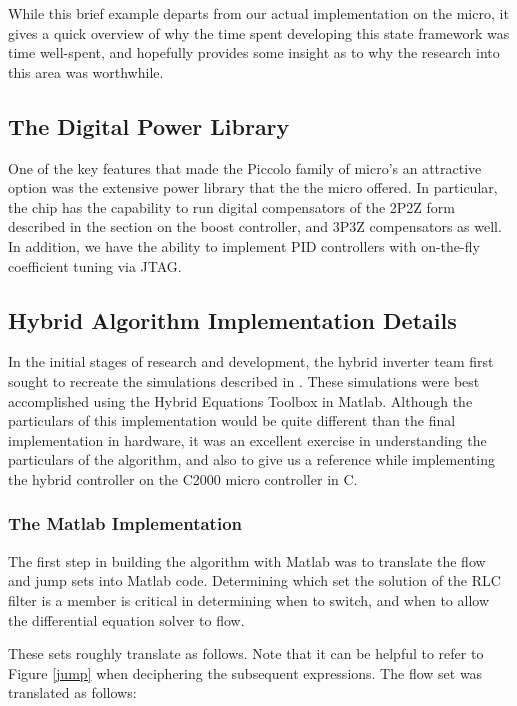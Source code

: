 While this brief example departs from our actual implementation on the micro, it gives a quick overview of why the time spent developing this state framework was time well-spent, and hopefully provides some insight as to why the research into this area was worthwhile.

\subsection{The Digital Power Library}
One of the key features that made the Piccolo family of micro's an attractive option was the extensive power library that the the micro offered. In particular, the chip has the capability to run digital compensators of the 2P2Z form described in the section on the boost controller, and 3P3Z compensators as well. In addition, we have the ability to implement PID controllers with on-the-fly coefficient tuning via JTAG.

\subsection{Hybrid Algorithm Implementation Details}
In the initial stages of research and development, the hybrid inverter team first sought to recreate the simulations described in \cite{ricardo}. These simulations were best accomplished using the Hybrid Equations Toolbox in Matlab. Although the particulars of this implementation would be quite different than the final implementation in hardware, it was an excellent exercise in understanding the particulars of the algorithm, and also to give us a reference while implementing the hybrid controller on the C2000 micro controller in C. 

\subsubsection{The Matlab Implementation}
The first step in building the algorithm with Matlab was to translate the flow and jump sets into Matlab code. Determining which set the solution of the RLC filter is a member is critical in determining when to switch, and when to allow the differential equation solver to flow. 

These sets roughly translate as follows. Note that it can be helpful to refer to Figure \ref{jump} when deciphering the subsequent expressions. The flow set was translated as follows:

\lstset{
  style              = Matlab-editor,
  basicstyle         = \mlttfamily,
  escapechar         = ",
  mlshowsectionrules = true,
}

